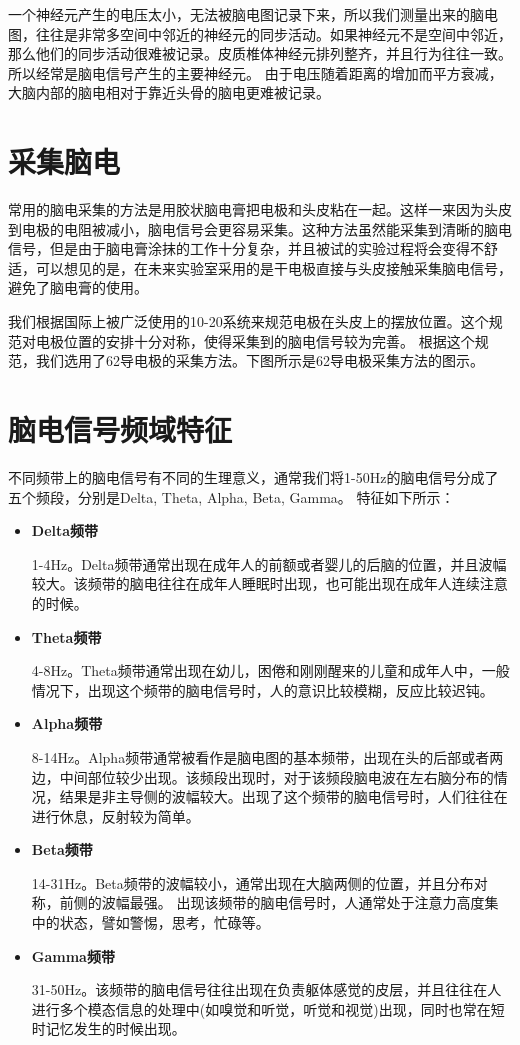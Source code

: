 	一个神经元产生的电压太小，无法被脑电图记录下来，所以我们测量出来的脑电图，往往是非常多空间中邻近的神经元的同步活动。如果神经元不是空间中邻近，那么他们的同步活动很难被记录。皮质椎体神经元排列整齐，并且行为往往一致。所以经常是脑电信号产生的主要神经元。 由于电压随着距离的增加而平方衰减，大脑内部的脑电相对于靠近头骨的脑电更难被记录。
	
\section{采集脑电}

	常用的脑电采集的方法是用胶状脑电膏把电极和头皮粘在一起。这样一来因为头皮到电极的电阻被减小，脑电信号会更容易采集。这种方法虽然能采集到清晰的脑电信号，但是由于脑电膏涂抹的工作十分复杂，并且被试的实验过程将会变得不舒适，可以想见的是，在未来实验室采用的是干电极直接与头皮接触采集脑电信号，避免了脑电膏的使用。
	
	我们根据国际上被广泛使用的10-20系统来规范电极在头皮上的摆放位置。这个规范对电极位置的安排十分对称，使得采集到的脑电信号较为完善。 根据这个规范，我们选用了62导电极的采集方法。下图所示是62导电极采集方法的图示。
	
\section{脑电信号频域特征}
	
		不同频带上的脑电信号有不同的生理意义，通常我们将1-50Hz的脑电信号分成了五个频段，分别是Delta, Theta, Alpha, Beta, Gamma。 特征如下所示：
		\begin{itemize}
			\item \textbf{Delta频带}
			
				1-4Hz。Delta频带通常出现在成年人的前额或者婴儿的后脑的位置，并且波幅较大。该频带的脑电往往在成年人睡眠时出现，也可能出现在成年人连续注意的时候。
				
			\item \textbf{Theta频带}
				
				4-8Hz。Theta频带通常出现在幼儿，困倦和刚刚醒来的儿童和成年人中，一般情况下，出现这个频带的脑电信号时，人的意识比较模糊，反应比较迟钝。
				
			\item \textbf{Alpha频带}
			
				8-14Hz。Alpha频带通常被看作是脑电图的基本频带，出现在头的后部或者两边，中间部位较少出现。该频段出现时，对于该频段脑电波在左右脑分布的情况，结果是非主导侧的波幅较大。出现了这个频带的脑电信号时，人们往往在进行休息，反射较为简单。
				
			\item \textbf{Beta频带}
			
				14-31Hz。Beta频带的波幅较小，通常出现在大脑两侧的位置，并且分布对称，前侧的波幅最强。 出现该频带的脑电信号时，人通常处于注意力高度集中的状态，譬如警惕，思考，忙碌等。
				
			\item \textbf{Gamma频带}
			
				31-50Hz。该频带的脑电信号往往出现在负责躯体感觉的皮层，并且往往在人进行多个模态信息的处理中(如嗅觉和听觉，听觉和视觉)出现，同时也常在短时记忆发生的时候出现。
		\end{itemize}
